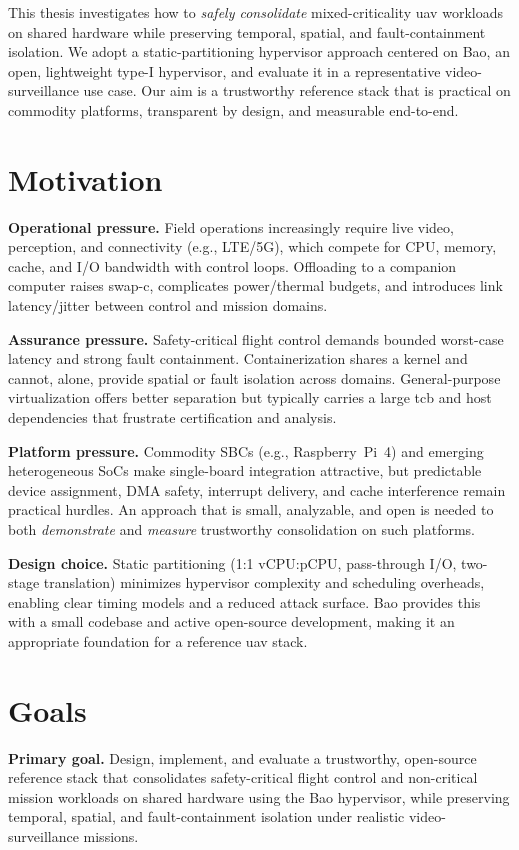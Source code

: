 This thesis investigates how to \emph{safely consolidate} mixed-criticality
\gls{uav} workloads on shared hardware while preserving temporal, spatial, and
fault-containment isolation. We adopt a static-partitioning hypervisor approach
centered on Bao, an open, lightweight type-I hypervisor, and evaluate it in a
representative video-surveillance use case. Our aim is a trustworthy reference
stack that is practical on commodity platforms, transparent by design, and
measurable end-to-end.

\section{Motivation}
\label{sec:motivation}
\noindent\textbf{Operational pressure.}
Field operations increasingly require live video, perception, and connectivity (e.g., LTE/5G), which compete for CPU, memory, cache, and I/O bandwidth with control loops. Offloading to a companion computer raises \gls{swap-c}, complicates power/thermal budgets, and introduces link latency/jitter between control and mission domains.

\noindent\textbf{Assurance pressure.}
Safety-critical flight control demands bounded worst-case latency and strong fault containment. Containerization shares a kernel and cannot, alone, provide spatial or fault isolation across domains. General-purpose virtualization offers better separation but typically carries a large \gls{tcb} and host dependencies that frustrate certification and analysis.

\noindent\textbf{Platform pressure.}
Commodity SBCs (e.g., Raspberry~Pi~4) and emerging heterogeneous SoCs make single-board integration attractive, but predictable device assignment, DMA safety, interrupt delivery, and cache interference remain practical hurdles. An approach that is small, analyzable, and open is needed to both \emph{demonstrate} and \emph{measure} trustworthy consolidation on such platforms.

\noindent\textbf{Design choice.}
Static partitioning (1:1 vCPU:pCPU, pass-through I/O, two-stage translation) minimizes hypervisor complexity and scheduling overheads, enabling clear timing models and a reduced attack surface. Bao provides this with a small codebase and active open-source development, making it an appropriate foundation for a reference \gls{uav} stack.

\section{Goals}
\label{sec:goals}
\noindent\textbf{Primary goal.}
Design, implement, and evaluate a trustworthy, open-source reference stack that consolidates safety-critical flight control and non-critical mission workloads on shared hardware using the Bao hypervisor, while preserving temporal, spatial, and fault-containment isolation under realistic video-surveillance missions.

